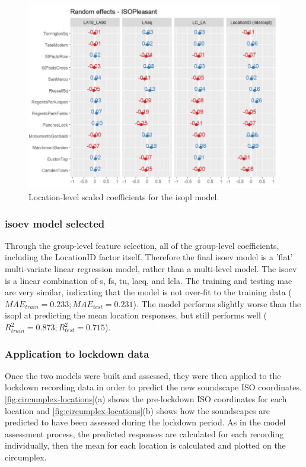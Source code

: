    \begin{figure}
     \caption{Location-level scaled coefficients for the \gls{isopl} model. \label{fig:pl-slopes}}
     \centering
     \includegraphics[width=\textwidth]{Figures/Lockdown Figure4.jpg}
   \end{figure}

   \subsubsection{\gls{isoev} model selected}

   Through the group-level feature selection, all of the group-level coefficients, including the LocationID factor itself. Therefore the final \gls{isoev} model is a 'flat' multi-variate linear regression model, rather than a multi-level model. The \gls{isoev} is a linear combination of \gls{s}, \gls{fs}, \gls{tu}, \gls{laeq}, and \gls{lcla}. The training and testing \gls{mae} are very similar, indicating that the model is not over-fit to the training data ($MAE_{train}=0.233; MAE_{test}=0.231$). The model performs slightly worse than the \gls{isopl} at predicting the mean location responses, but still performs well ($R^2_{train}=0.873; R^2_{test}=0.715$).

   \subsubsection{Application to lockdown data}
   Once the two models were built and assessed, they were then applied to the lockdown recording data in order to predict the new soundscape ISO coordinates. \cref{fig:circumplex-locations}(a) shows the pre-lockdown ISO coordinates for each location and \cref{fig:circumplex-locations}(b) shows how the soundscapes are predicted to have been assessed during the lockdown period. As in the model assessment process, the predicted responses are calculated for each recording individually, then the mean for each location is calculated and plotted on the circumplex.

